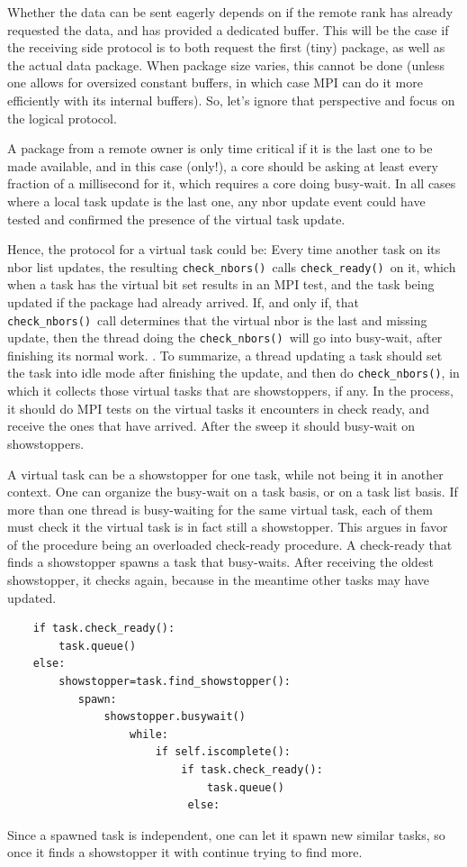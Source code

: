 \documentclass[paper=a4,fontsize=11pt]{scrartcl}
\numberwithin{equation}{section}		%
\numberwithin{figure}{section}			%
\numberwithin{table}{section}				%
\newcommand{\codecolor}{\color{Blue}}
\newcommand{\Code}[1]{{\codecolor\texttt{#1}}}
\def\checkready{\Code{check\_ready()}}
\def\checknbors{\Code{check\_nbors()}}
\begin{document}
Whether the data can be sent eagerly depends on if the remote rank has already requested the data, and has provided a dedicated buffer.  This will be the case if the receiving side protocol is to both request the first (tiny) package, as well as the actual data package. When package size varies, this cannot be done (unless one allows for oversized constant buffers, in which case MPI can do it more efficiently with its internal buffers).  So, let's ignore that perspective and focus on the logical protocol.

A package from a remote owner is only time critical if it is the last one to be made available, and in this case (only!), a core should be asking at least every fraction of a millisecond for it, which requires a core doing busy-wait.  In all cases where a local task update is the last one, any nbor update event could have tested and confirmed the presence of the virtual task update.

Hence, the protocol for a virtual task could be: Every time another task on its nbor list updates, the resulting \checknbors\ calls \checkready\ on it, which when a task has the virtual bit set results in an MPI test, and the task being updated if the package had already arrived.  If, and only if, that \checknbors\ call determines that the virtual nbor is the last and missing update, then the thread doing the \checknbors\ will go into busy-wait, after finishing its normal work.
.
To summarize, a thread updating a task should set the task into idle mode after finishing the update, and then do \checknbors, in which it collects those virtual tasks that are showstoppers, if any.  In the process, it should do MPI tests on the virtual tasks it encounters in check ready, and receive the ones that have arrived.  After the sweep it should busy-wait on showstoppers.

A virtual task can be a showstopper for one task, while not being it in another context. One can organize the busy-wait on a task basis, or on a task list basis. If more than one thread is busy-waiting for the same virtual task, each of them must check it the virtual task is in fact still a showstopper. This argues in favor of the procedure being an overloaded check-ready procedure. A check-ready that finds a showstopper spawns a task that busy-waits. After receiving the oldest showstopper, it checks again, because in the meantime other tasks may have updated.

{\codecolor\small\begin{verbatim}
    if task.check_ready():
        task.queue()
    else:
        showstopper=task.find_showstopper():
           spawn:
               showstopper.busywait()
                   while:
                       if self.iscomplete():
                           if task.check_ready():
                               task.queue()
                            else:
\end{verbatim}}
Since a spawned task is independent, one can let it spawn new similar tasks, so once it finds a showstopper it with continue trying to find more.
\end{document}
